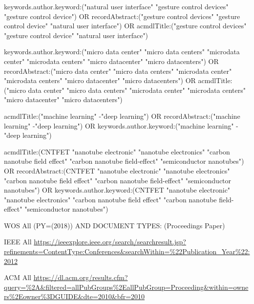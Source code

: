 
keywords.author.keyword:("natural user interface" "gesture control devices" "gesture control device") OR recordAbstract:("gesture control devices" "gesture control device" "natural user interface") OR acmdlTitle:("gesture control devices" "gesture control device" "natural user interface")

keywords.author.keyword:("micro data center" "micro data centers" "microdata center" "microdata centers" "micro datacenter" "micro datacenters") OR recordAbstract:("micro data center" "micro data centers" "microdata center" "microdata centers" "micro datacenter" "micro datacenters") OR acmdlTitle:("micro data center" "micro data centers" "microdata center" "microdata centers" "micro datacenter" "micro datacenters")

acmdlTitle:("machine learning" -"deep learning") OR recordAbstract:("machine learning" -"deep learning") OR keywords.author.keyword:("machine learning" -"deep learning")

acmdlTitle:(CNTFET "nanotube electronic" "nanotube electronics" "carbon nanotube field effect" "carbon nanotube field-effect" "semiconductor nanotubes") OR recordAbstract:(CNTFET "nanotube electronic" "nanotube electronics" "carbon nanotube field effect" "carbon nanotube field-effect" "semiconductor nanotubes") OR keywords.author.keyword:(CNTFET "nanotube electronic" "nanotube electronics" "carbon nanotube field effect" "carbon nanotube field-effect" "semiconductor nanotubes")


WOS All
(PY=(2018)) AND DOCUMENT TYPES: (Proceedings Paper)

IEEE All
\url{https://ieeexplore.ieee.org/search/searchresult.jsp?refinements=ContentType:Conferences&searchWithin=%22Publication_Year%22:2012}
	
ACM All
\url{https://dl.acm.org/results.cfm?query=%2A&filtered=allPubGroups%2EallPubGroup=Proceeding&within=owners%2Eowner%3DGUIDE&dte=2010&bfr=2010}